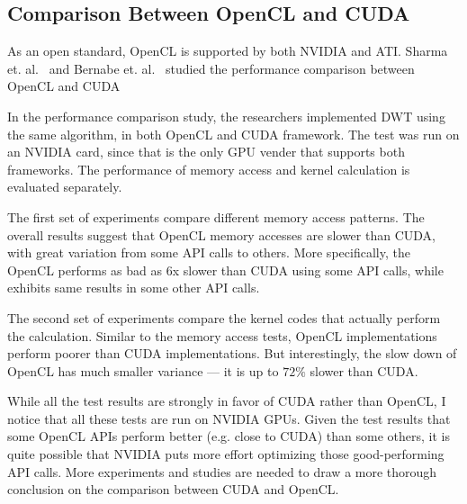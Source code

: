 \subsection{Comparison Between OpenCL and CUDA}
\label{sec:opencl-cuda}
%
As an open standard, OpenCL is supported by both NVIDIA and ATI.
%
Sharma et. al.~\cite{sharma2010parallel} and 
Bernabe et. al.~\cite{bernabe2012cuda}
studied the performance comparison between OpenCL and CUDA


In the performance comparison study, the researchers implemented DWT
using the same algorithm, in both OpenCL and CUDA framework.
%
The test was run on an NVIDIA card, since that is the only GPU vender 
that supports both frameworks.
%
The performance of memory access and kernel calculation is evaluated separately.


The first set of experiments compare different memory access patterns.
%
The overall results suggest that OpenCL memory accesses are slower than CUDA,
with great variation from some API calls to others.
%
More specifically, the OpenCL performs as bad as 6x slower than CUDA using 
some API calls, while exhibits same results in some other API calls.


The second set of experiments compare the kernel codes that actually
perform the calculation.
%
Similar to the memory access tests, OpenCL implementations perform
poorer than CUDA implementations.
%
But interestingly, the slow down of OpenCL has much smaller variance
--- it is up to $72\%$ slower than CUDA.



While all the test results are strongly in favor of CUDA rather than 
OpenCL, I notice that all these tests are run on NVIDIA GPUs. 
%
Given the test results that some OpenCL APIs perform better (e.g. 
close to CUDA) than some others, it is quite possible that NVIDIA puts 
more effort optimizing those good-performing API calls.
%
More experiments and studies are needed to draw a more thorough 
conclusion on the comparison between CUDA and OpenCL.
 
